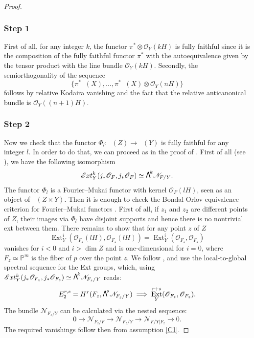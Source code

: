 \documentclass[JEP,XML,SOM,Unicode,NoEqCountersInSection]{cedram}
\newcommand\bw[1]{{\hbox{\large$\mathsf{\Lambda}$}^{\!#1}}}
\let\mathcal\mathscr
\theoremstyle{plain}
\theoremstyle{definition}
\newcommand{\cat}[1]{\mathsf{#1}}
\DeclareMathOperator{\Db}{{\cat{D}^{\mathrm{b}}}}
\DeclareMathOperator{\Ext}{Ext}
\newcommand{\PP}{\mathbb{P}}
\newcommand{\sheaf}[1]{\mathcal{#1}}
\newcommand{\kn}{\sheaf{N}}
\newcommand{\ko}{\sheaf{O}}\let\OO\ko\let\cO\ko
\begin{document}
\skpt
\begin{proof}\vspace*{-8pt}
\subsubsection*{Step 1}
First of all, for any integer $k$, the functor $\pi^* \otimes \ko_Y(kH)$ is fully faithful since it
is the composition of the fully faithful functor $\pi^*$ with the autoequivalence given by the tensor
product with the line bundle $\ko_Y(kH)$. Secondly, the semiorthogonality of the
sequence
\[
\{ \pi^*\Db(X),\ldots,\pi^*\Db(X)\otimes \ko_Y(nH) \}
\]
follows by
relative Kodaira vanishing and the fact that the relative anticanonical bundle is $\ko_Y((n+1)H)$.

\subsubsection*{Step 2}
Now we check that the functor $\Phi_l : \Db(Z) \to \Db(Y)$ is fully faithful for any
integer $l$.
In order to do that, we can proceed as in the proof of \cite[Prop.\,11.16]{Huybook}.
First of all (see \cite[Prop.\,11.8]{Huybook}), we have the following isomorphism
\[
{\mathcal{E}}xt_Y^k (j_*\ko_F,j_*\ko_F) \simeq \bw{k} \kn_{F/Y}.
\]
The functor $\Phi_l$ is a Fourier--Mukai functor with kernel $\ko_F(lH)$, seen as an object of
$\Db(Z \times Y)$. Then it is enough to check the Bondal-Orlov equivalence criterion for Fourier--Mukai
functors \cite{bondal-orlov-archive}. First of all, if $z_1$ and $z_2$ are different points of $Z$,
their images via $\Phi_l$ have disjoint supports and hence there is no nontrivial ext between them.
There remains to show that for any
point $z$ of $Z$
\[
\Ext^i_Y(\ko_{F_z}(lH),\ko_{F_z}(lH)) = \Ext^i_Y(\ko_{F_z},\ko_{F_z})
\]
vanishes for $i<0$ and $i>\dim Z$ and is one-dimensional for $i=0$, where $F_z \simeq \PP^m$
is the fiber of $p$ over the point $z$. We follow \cite[Prop.\,11.16]{Huybook}, and use the local-to-global
spectral sequence for the Ext groups, which, using
${\mathcal{E}}xt_Y^k (j_*\ko_{F_z},j_*\ko_{F_z}) \simeq \bw{k} \kn_{F_z/Y}$ reads:\vspace*{-3pt}
\[
E^{r,s}_2=H^r(F_z,\bw{s} \kn_{F_z/Y}) \implies \Ext_Y^{r+s}(\ko_{F_z},\ko_{F_z}).
\]
The bundle $\kn_{F_z/Y}$ can be calculated via the nested sequence:\vspace*{-3pt}
\[
0 \to \kn_{F_z/F} \to \kn_{F_z/Y} \to \kn_{F/Y \vert F_z} \to 0.
\]
The required vanishings follow then from assumption \eqref{C1}.


\end{proof}
\end{document}

